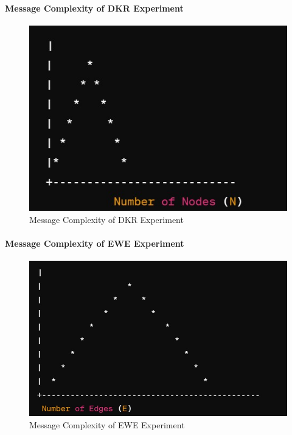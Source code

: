 \documentclass[11pt]{beamer}              %
\begin{document}
\begin{frame}{}
\framesubtitle{Message Complexity of DKR Experiment}

\begin{figure}
    \centering
    \includegraphics[scale=0.6]{figures/Screen18.jpg}
    \caption{Message Complexity of DKR Experiment}
    \label{fig:Message Complexity}
\end{figure}
\note{
}
\end{frame}


\begin{frame}{}
\framesubtitle{Message Complexity of EWE Experiment}

\begin{figure}
    \centering
    \includegraphics[scale=0.6]{figures/Screen31.jpg}
    \caption{Message Complexity of EWE Experiment}
    \label{fig:Message Complexity}
\end{figure}
\note{
}
\end{frame}
\end{document}
